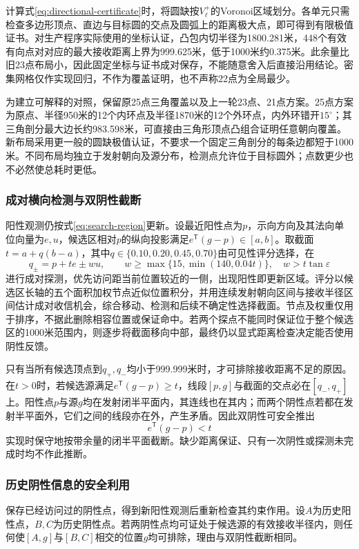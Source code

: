 \documentclass{JXUSTmodeling}
\begin{document}
计算式\eqref{eq:directional-certificate}时，将圆缺按$V_\ell^+$的Voronoi区域划分\cite{deberg2008}。各单元只需检查多边形顶点、直边与目标圆的交点及圆弧上的距离极大点，即可得到有限极值证书。对生产程序实际使用的坐标认证，凸包内切半径为1800.281米，448个有效有向点对对应的最大接收距离上界为999.625米，低于1000米约0.375米。此余量比旧23点布局小，因此固定坐标与证书成对保存，不能随意舍入后直接沿用结论。密集网格仅作实现回归，不作为覆盖证明，也不声称22点为全局最少。

为建立可解释的对照，保留原25点三角覆盖以及上一轮23点、21点方案。25点方案为原点、半径950米的12个内环点及半径1870米的12个外环点，内外环错开$15^\circ$；其三角剖分最大边长约983.598米，可直接由三角形顶点凸组合证明任意朝向覆盖。新布局采用更一般的圆缺极值认证，不要求一个固定三角剖分的每条边都短于1000米。不同布局均独立于发射朝向及源分布，检测点允许位于目标圆外；点数更少也不必然使总耗时更低。

\subsubsection{成对横向检测与双阴性截断}
阳性观测仍按式\eqref{eq:search-region}更新。设最近阳性点为$p$，示向方向及其法向单位向量为$e,u$，候选区相对$p$的纵向投影满足$e^{\mathsf T}(g-p)\in[a,b]$。取截面$t=a+q(b-a)$，其中$q\in\{0.10,0.20,0.45,0.70\}$由可见性评分选择，在
\begin{equation}
 q_\pm=p+te\pm wu,\qquad
 w\ge\max\{15,\min(140,0.04t)\},\quad w>t\tan\varepsilon
 \label{eq:paired-probe}
\end{equation}
进行成对探测，优先访问距当前位置较近的一侧，出现阳性即更新区域。评分以候选区长轴的五个面积加权节点近似位置积分，并用连续发射朝向区间与接收半径区间估计成对收信机会，综合移动、检测和后续不确定性选择截面。节点及权重仅用于排序，不据此删除相容位置或保证命中。若两个探点不能同时保证位于整个候选区的1000米范围内，则逐步将截面移向中部，最终仍以显式距离检查决定能否使用阴性反馈。

只有当所有候选顶点到$q_+,q_-$均小于999.999米时，才可排除接收距离不足的原因。在$t>0$时，若候选源满足$e^{\mathsf T}(g-p)\ge t$，线段$[p,g]$与截面的交点必在$[q_-,q_+]$上。阳性点$p$与源$g$均在发射闭半平面内，其连线也在其内；而两个阴性点若都在发射半平面外，它们之间的线段亦在外，产生矛盾。因此双阴性可安全推出
\begin{equation}
 e^{\mathsf T}(g-p)<t
 \label{eq:paired-negative}
\end{equation}
实现时保守地按带余量的闭半平面截断。缺少距离保证、只有一次阴性或探测未完成时均不作此推断。

\subsubsection{历史阴性信息的安全利用}
保存已经访问过的阴性点，得到新阳性观测后重新检查其约束作用。设$A$为历史阳性点，$B,C$为历史阴性点。若两阴性点均可证处于候选源的有效接收半径内，则任何使$[A,g]$与$[B,C]$相交的位置$g$均可排除，理由与双阴性截断相同。
\end{document}
